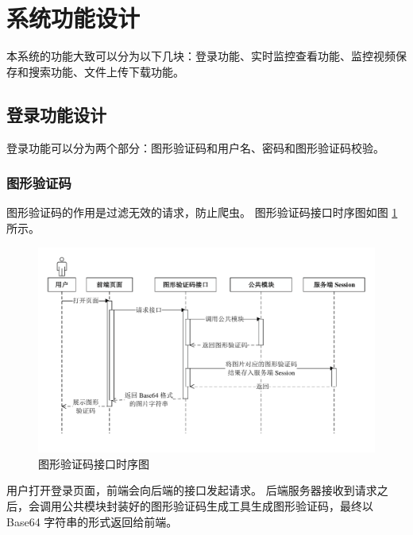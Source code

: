 



\newpage
\section{系统功能设计}
本系统的功能大致可以分为以下几块：登录功能、实时监控查看功能、监控视频保存和搜索功能、文件上传下载功能。

\subsection{登录功能设计}
登录功能可以分为两个部分：图形验证码和用户名、密码和图形验证码校验。


\subsubsection{图形验证码}
图形验证码的作用是过滤无效的请求，防止爬虫。
图形验证码接口时序图如图 \ref{Fig:code_seq} 所示。

\begin{figure}[ht]
    \centering
    \includegraphics[width=1\linewidth]{./Figure/IMG_code_seq.pdf}
    \caption{图形验证码接口时序图}\label{Fig:code_seq}
\end{figure}

用户打开登录页面，前端会向后端的接口发起请求。
后端服务器接收到请求之后，会调用公共模块封装好的图形验证码生成工具生成图形验证码，最终以 Base64 字符串的形式返回给前端。


